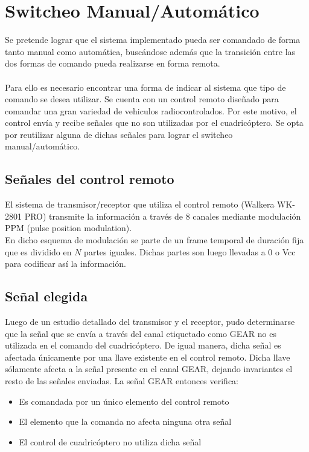 \documentclass[main]{subfiles}
\begin{document}
\chapter{Switcheo Manual/Automático}
\label{chap:anexo_switcheo}

Se pretende lograr que el sistema implementado pueda ser comandado de forma tanto manual como automática, buscándose además que la transición entre las dos formas de comando pueda realizarse en forma remota.\\
\\
Para ello es necesario encontrar una forma de indicar al sistema que tipo de comando se desea utilizar. Se cuenta con un control remoto diseñado para comandar una gran variedad de vehiculos radiocontrolados. Por este motivo, el control envía y recibe señales que no son utilizadas por el cuadricóptero. Se opta por reutilizar alguna de dichas señales para lograr el switcheo manual/automático.

\section{Señales del control remoto}

El sistema de transmisor/receptor que utiliza el control remoto (Walkera WK-2801 PRO) transmite la información a través de 8 canales mediante modulación PPM (pulse position modulation).\\

En dicho esquema de modulación se parte de un frame temporal de duración fija que es dividido en $N$ partes iguales. Dichas partes son luego llevadas a 0 o Vcc para codificar así la información.\\

\section{Señal elegida}
Luego de un estudio detallado del transmisor y el receptor, pudo determinarse que la señal que se envía a través del canal etiquetado como GEAR no es utilizada en el comando del cuadricóptero. De igual manera, dicha señal es afectada únicamente por una llave existente en el control remoto. Dicha llave sólamente afecta a la señal presente en el canal GEAR, dejando invariantes el resto de las señales enviadas. La señal GEAR entonces verifica:

\begin{itemize}
\item Es comandada por un único elemento del control remoto
\item El elemento que la comanda no afecta ninguna otra señal
\item El control de cuadricóptero no utiliza dicha señal
\end{itemize}
\end{document}
